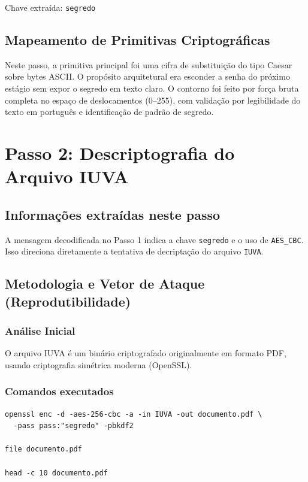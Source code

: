 \documentclass[12pt,a4paper]{article}
\begin{document}
Chave extraída: \texttt{segredo}

\subsection{Mapeamento de Primitivas Criptográficas}

Neste passo, a primitiva principal foi uma cifra de substituição do tipo Caesar sobre bytes ASCII.
O propósito arquitetural era esconder a senha do próximo estágio sem expor o segredo em texto claro.
O contorno foi feito por força bruta completa no espaço de deslocamentos (0--255), com validação por legibilidade do texto em português e identificação de padrão de segredo.



\section{Passo 2: Descriptografia do Arquivo IUVA}

\subsection{Informações extraídas neste passo}

A mensagem decodificada no Passo 1 indica a chave \texttt{segredo} e o uso de \texttt{AES\_CBC}. Isso direciona diretamente a tentativa de decriptação do arquivo \texttt{IUVA}.

\subsection{Metodologia e Vetor de Ataque (Reprodutibilidade)}

\subsubsection{Análise Inicial}

O arquivo IUVA é um binário criptografado originalmente em formato PDF, usando criptografia simétrica moderna (OpenSSL).

\subsubsection{Comandos executados}

\begin{lstlisting}[caption=Descriptografar com OpenSSL]
openssl enc -d -aes-256-cbc -a -in IUVA -out documento.pdf \
  -pass pass:"segredo" -pbkdf2

file documento.pdf

head -c 10 documento.pdf  
\end{lstlisting}
\end{document}
